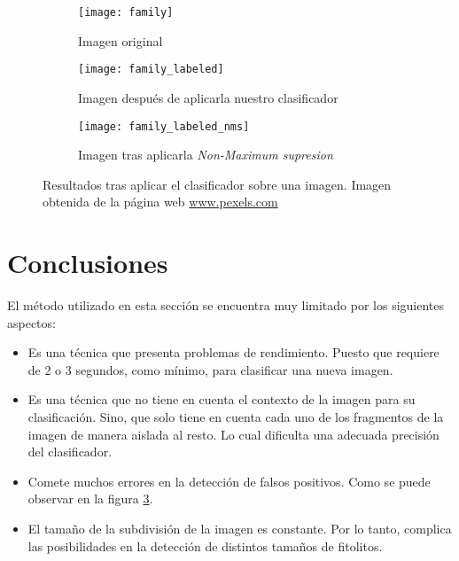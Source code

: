 \begin{figure}
	\centering
	\begin{subfigure}[b]{0.45\textwidth}
        \texttt{[image: family]}
        \caption{Imagen original}
        \label{subfig:family}
    \end{subfigure}
    \begin{subfigure}[b]{0.45\textwidth}
        \texttt{[image: family\_labeled]}
        \caption{Imagen después de aplicarla nuestro clasificador}
        \label{subfig:family_labeled}
    \end{subfigure}
    \begin{subfigure}[b]{0.45\textwidth}
        \texttt{[image: family\_labeled\_nms]}
        \caption{Imagen tras aplicarla \textit{Non-Maximum supresion}}
         \label{subfig:family_labeled_nms}
    \end{subfigure}
        \caption[Resultados tras aplicar el clasificador sobre una imagen]{Resultados tras aplicar el clasificador sobre una imagen. Imagen obtenida de la página web \hyperref[www.pexels.com]{www.pexels.com}}
	\label{fig:5.1.4}
\end{figure}

\section{Conclusiones}

El método utilizado en esta sección se encuentra muy limitado por los siguientes aspectos:

\begin{itemize}
	\item Es una técnica que presenta problemas de rendimiento. Puesto que requiere de 2 o 3 segundos, como mínimo, para clasificar una nueva imagen.
	\item Es una técnica que no tiene en cuenta el contexto de la imagen para su clasificación. Sino, que solo tiene en cuenta cada uno de los fragmentos de la imagen de manera aislada al resto. Lo cual dificulta una adecuada precisión del clasificador.
	\item Comete muchos errores en la detección de falsos positivos. Como se puede observar en la figura \ref{subfig:family_labeled_nms}.
	\item El tamaño de la subdivisión de la imagen es constante. Por lo tanto, complica las posibilidades en la detección de distintos tamaños de fitolitos.
\end{itemize}

